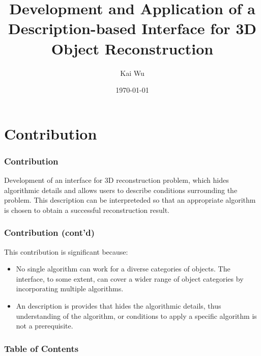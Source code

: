 \documentclass{beamer}
\title[Interface of 3D Reconstruction]{Development and Application of a Description-based Interface for 3D Object Reconstruction} %
\author{Kai Wu} %
\institute[UBC] %
{
University of British Columbia \\ %
\medskip
\textit{kaywu@ece.ubc.ca} \\ %
}
\date{\today} %
\begin{document}
\begin{frame}
\titlepage %
\end{frame}

\section{Contribution} %


\begin{frame}
\frametitle{Contribution}
Development of an interface for 3D reconstruction problem, which hides algorithmic details and allows users to describe conditions surrounding the problem. This description can be interpreteded so that an appropriate algorithm is chosen to obtain a successful reconstruction result.
\end{frame}

\begin{frame}
\frametitle{Contribution (cont'd)}
This contribution is significant because:
\begin{itemize}
\item No single algorithm can work for a diverse categories of objects. The interface, to some extent, can cover a wider range of object categories by incorporating multiple algorithms.
\item An description is provides that hides the algorithmic details, thus understanding of the algorithm, or conditions to apply a specific algorithm is not a prerequisite.
\end{itemize}
\end{frame}

\begin{frame}
\frametitle{Table of Contents} %
\tableofcontents %
\end{frame}
\end{document}
